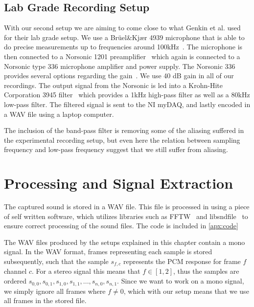 \subsection{Lab Grade Recording Setup}\label{chp3:sec:bruel_kjaer_configuration}
With our second setup we are aiming to come close to what Genkin et al. used for their lab grade setup.
We use a Brüel\&Kjær 4939 microphone that is able to do precise measurements up to frequencies around 100kHz~\cite{url:bk4939_spec}.
The microphone is then connected to a Norsonic 1201 preamplifier~\cite{url:norsonic1201_spec} which again is connected to a Norsonic type 336 microphone amplifier and power supply.
The Norsonic 336 provides several options regarding the gain~\cite{url:nor336_spec}. 
We use 40 dB gain in all of our recordings.
The output signal from the Norsonic is led into a Krohn-Hite Corporation 3945 filter~\cite{url:krohn-hite3945_spec} which provides a 1kHz high-pass filter as well as a 80kHz low-pass filter.
The filtered signal is sent to the \gls{NI} myDAQ, and lastly encoded in a WAV file using a laptop computer. 

The inclusion of the band-pass filter is removing some of the aliasing suffered in the experimental recording setup, but even here the relation between sampling frequency and low-pass frequency suggest that we still suffer from aliasing.


\section{Processing and Signal Extraction}\label{chp3:sec:processing_signal_extraction}
The captured sound is stored in a WAV file.
This file is processed in using a piece of self written software, which utilizes libraries such as FFTW~\cite{url:fftw} and libsndfile~\cite{url:libsndfile} to ensure correct processing of the sound files.
The code is included in \autoref{apx:code}

The WAV files produced by the setups explained in this chapter contain a mono signal. 
In the WAV format, frames representing each sample is stored subsequently, such that the sample \( s_{f,c} \) represents the \gls{PCM} response for frame \( f \) channel \( c \). 
For a stereo signal this means that \( f \in \left [ 1, 2 \right ] \), thus the samples are ordered  \( s_{0,0}, s_{0,1}, s_{1,0}, s_{1,1}, ... , s_{n,0}, s_{n,1} \).
Since we want to work on a mono signal, we simply ignore all frames where \( f \neq 0 \), which with our setup means that we use all frames in the stored file.

